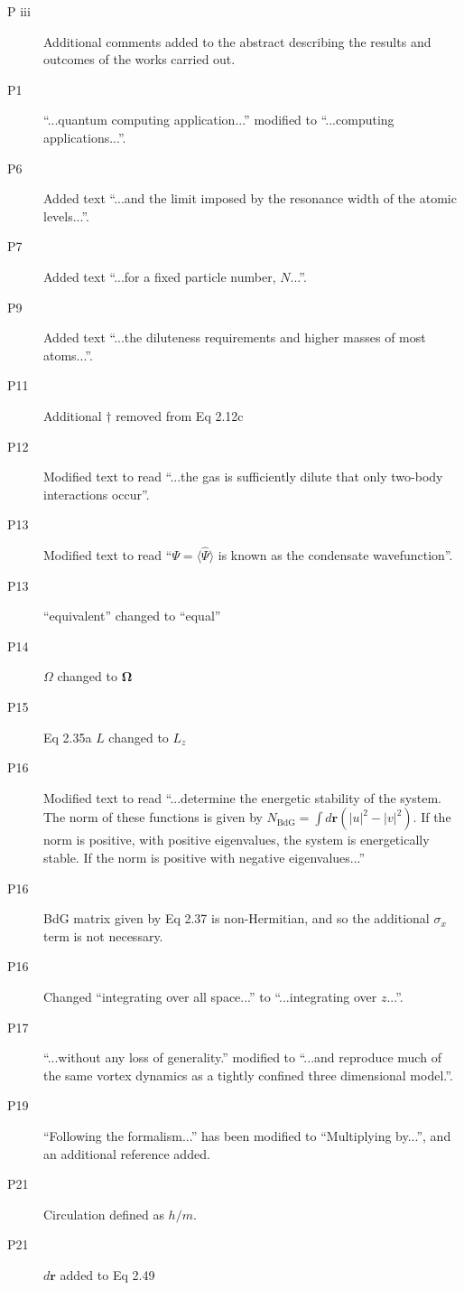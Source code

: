 \documentclass[paper=a4, fontsize=12pt]{scrartcl}
\begin{document}
\begin{description}
    \item [P iii] Additional comments added to the abstract describing the results and outcomes of the works carried out.
    \item [P1] ``...quantum computing application...'' modified to ``...computing applications...''.
    \item [P6] Added text ``...and the limit imposed by the resonance width of the atomic levels...''.
    \item [P7] Added text ``...for a fixed particle number, $N$...''.
    \item [P9] Added text ``...the diluteness requirements and higher masses of most atoms...''.
    \item [P11] Additional $\dagger$ removed from Eq 2.12c
    \item [P12] Modified text to read ``...the gas is sufficiently dilute that only two-body interactions occur''.
    \item [P13] Modified text to read ``$\Psi = \langle \hat{\Psi} \rangle$ is known as the condensate wavefunction''.
    \item [P13] ``equivalent'' changed to ``equal''
    \item [P14] $\Omega$ changed to $\mathbf{\Omega}$
    \item [P15] Eq 2.35a $L$ changed to $L_z$
    \item [P16] Modified text to read ``...determine the energetic stability of the system. The norm of these functions is given by $N_{\textrm{BdG}}=\int d\mathbf{r}(|u|^2 - |v|^2)$. If the norm is positive, with positive eigenvalues, the system is energetically stable. If the norm is positive with negative eigenvalues...''
    \item [P16] BdG matrix given by Eq 2.37 is non-Hermitian, and so the additional $\sigma_x$ term is not necessary.
    \item [P16] Changed ``integrating over all space...'' to ``...integrating over $z$...''.
    \item [P17] ``...without any loss of generality.'' modified to ``...and reproduce much of the same vortex dynamics as a tightly confined three dimensional model.''.
    \item [P19] ``Following the formalism...'' has been modified to ``Multiplying by...'', and an additional reference added.
    \item [P21] Circulation defined as $h/m$.
    \item [P21] $d\mathbf{r}$ added to Eq 2.49

\end{description}
\end{document}
